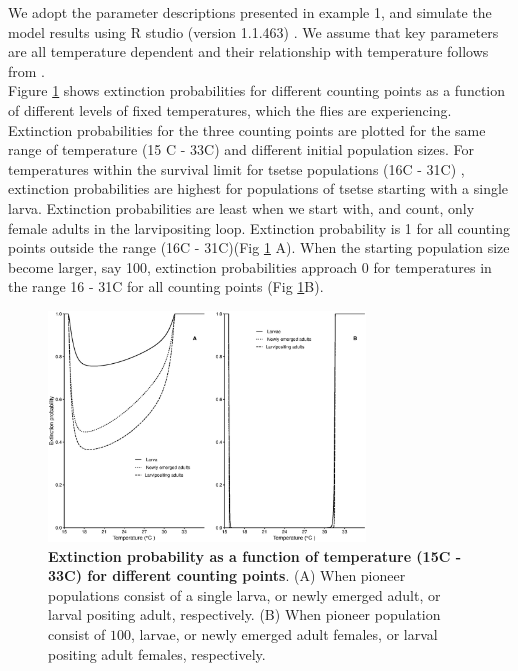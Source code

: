 We adopt the parameter descriptions presented in example 1, and simulate the model results using R studio (version 1.1.463) \cite{RStudioTeam2016}. We assume that key parameters are all temperature dependent and their relationship with temperature follows from \cite{Lord2018,PhelpsR.J.&Burrows,Hargrove2004a,Hargrove2019a}.\\


Figure \ref{fig:2} shows extinction probabilities for different counting points as a function of different levels of fixed temperatures, which the flies are experiencing. Extinction probabilities for the three counting points are plotted for the same range of temperature (15 \degree C - 33\degree C) and different initial population sizes. For temperatures within the survival limit for tsetse populations (16\degree C - 31\degree C) \cite{Are2019}, extinction probabilities are highest for populations of tsetse starting with a single larva. Extinction probabilities are least when we start with, and count, only female adults in the larvipositing loop. Extinction probability is 1 for all counting points outside the range (16\degree C - 31\degree C)(Fig \ref{fig:2} A).  When the starting population size become larger, say 100, extinction probabilities approach 0 for temperatures in the range  16 - 31\degree C for all counting points (Fig \ref{fig:2}B).


\begin{figure}[h]
	\includegraphics[width=0.75\textwidth]{Nov26-1.eps}
	\caption{{\bf Extinction probability as a function of temperature (15\degree C - 33\degree C) for different counting points}. (A) When pioneer populations consist of  a single larva, or newly emerged adult, or larval positing adult, respectively. (B) When pioneer population consist of  $100$, larvae, or newly emerged adult females, or larval positing adult females, respectively.}
	\label{fig:2}       %
\end{figure}
%
\newpage

